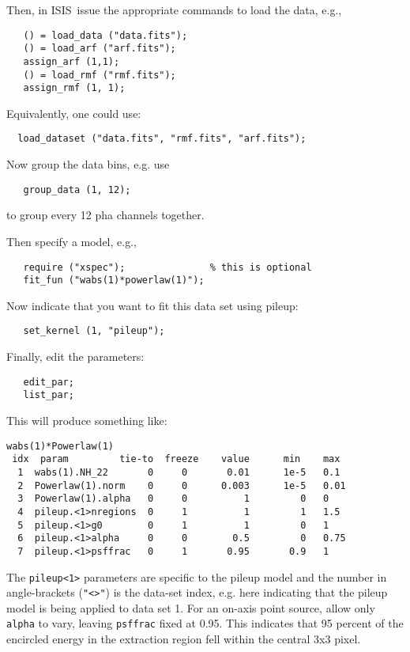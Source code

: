 \documentclass{book}
\newcommand{\isisx}{{\sc ISIS~}}
\begin{document}
{Then,  in \isisx issue the appropriate commands to load the data, e.g.,
\begin{verbatim}
   () = load_data ("data.fits");
   () = load_arf ("arf.fits");
   assign_arf (1,1);
   () = load_rmf ("rmf.fits");
   assign_rmf (1, 1);
\end{verbatim}
Equivalently, one could use:
\begin{verbatim}
  load_dataset ("data.fits", "rmf.fits", "arf.fits");
\end{verbatim}

Now group the data bins, e.g. use
\begin{verbatim}
   group_data (1, 12);
\end{verbatim}
to group every 12 pha channels together.

Then specify a model, e.g.,
\begin{verbatim}
   require ("xspec");               % this is optional
   fit_fun ("wabs(1)*powerlaw(1)");
\end{verbatim}

Now indicate that you want to fit this data set using pileup:
\begin{verbatim}
   set_kernel (1, "pileup");
\end{verbatim}

Finally, edit the parameters:
\begin{verbatim}
   edit_par;
   list_par;
\end{verbatim}

This will produce something like:
\begin{verbatim}
wabs(1)*Powerlaw(1)
 idx  param         tie-to  freeze    value      min    max
  1  wabs(1).NH_22       0     0       0.01      1e-5   0.1
  2  Powerlaw(1).norm    0     0      0.003      1e-5   0.01
  3  Powerlaw(1).alpha   0     0          1         0   0
  4  pileup.<1>nregions  0     1          1         1   1.5
  5  pileup.<1>g0        0     1          1         0   1
  6  pileup.<1>alpha     0     0        0.5         0   0.75
  7  pileup.<1>psffrac   0     1       0.95       0.9   1
\end{verbatim}

The \verb|pileup<1>| parameters are specific to the pileup model and the
number in angle-brackets (\verb|"<>"|) is the data-set index, e.g. here
indicating that the pileup model is being applied to data set 1.
For an on-axis point source, allow only \verb|alpha| to vary, leaving
\verb|psffrac| fixed at 0.95.  This indicates that 95 percent
of the encircled energy in the extraction region fell within the
central 3x3 pixel.

}
\end{document}
